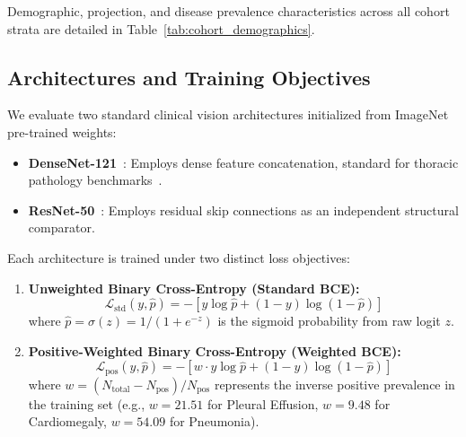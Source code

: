 \documentclass[journal]{IEEEtran}
\begin{document}
Demographic, projection, and disease prevalence characteristics across all cohort strata are detailed in Table~\ref{tab:cohort_demographics}.

\begin{table}[!t]
\caption{Cohort Demographics, Radiographic Projections, and Target Condition Prevalence across Stratified Cohorts}
\label{tab:cohort_demographics}
\centering
\resizebox{\textwidth}{!}{%

}
\end{table}

\subsection{Architectures and Training Objectives}
We evaluate two standard clinical vision architectures initialized from ImageNet pre-trained weights:
\begin{itemize}
    \item \textbf{DenseNet-121}~\cite{densenet2017huang}: Employs dense feature concatenation, standard for thoracic pathology benchmarks~\cite{rajpurkar2017chexnet}.
    \item \textbf{ResNet-50}~\cite{resnet2016he}: Employs residual skip connections as an independent structural comparator.
\end{itemize}

Each architecture is trained under two distinct loss objectives:
\begin{enumerate}
    \item \textbf{Unweighted Binary Cross-Entropy (Standard BCE):}
    \begin{equation}
    \mathcal{L}_{\text{std}}(y, \hat{p}) = - [y \log \hat{p} + (1 - y) \log(1 - \hat{p})]
    \end{equation}
    where $\hat{p} = \sigma(z) = 1 / (1 + e^{-z})$ is the sigmoid probability from raw logit $z$.
    \item \textbf{Positive-Weighted Binary Cross-Entropy (Weighted BCE):}
    \begin{equation}
    \mathcal{L}_{\text{pos}}(y, \hat{p}) = - [w \cdot y \log \hat{p} + (1 - y) \log(1 - \hat{p})]
    \end{equation}
    where $w = (N_{\text{total}} - N_{\text{pos}}) / N_{\text{pos}}$ represents the inverse positive prevalence in the training set (e.g., $w = 21.51$ for Pleural Effusion, $w = 9.48$ for Cardiomegaly, $w = 54.09$ for Pneumonia).
\end{enumerate}
\end{document}
